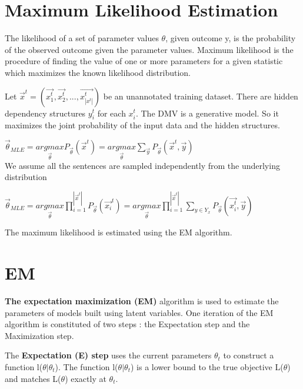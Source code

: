 \documentclass{book}
\begin{document}
\section{Maximum Likelihood Estimation}

The likelihood of a set of parameter values $\theta$, given outcome y, is the probability of the observed outcome given the parameter values. Maximum likelihood is the procedure of finding the value of one or more parameters for a given statistic which maximizes the known likelihood distribution.

Let $\overrightarrow{x}^t = (\overrightarrow{x_1^t}, \overrightarrow{x_2^t}, ..., \overrightarrow{x_{|x^t|}^t})$ be an unannotated training dataset. There are hidden dependency structures $y_i^t$ for each $x_i^t$. The DMV is a generative model. So it maximizes the joint probability of the input data and the hidden structures.


\begin{center}
$\overrightarrow{\theta}_{MLE} = \underset{\overrightarrow{\theta}}{argmax} P_{\overrightarrow{\theta}}(\overrightarrow{x}^t) = \underset{\overrightarrow{\theta}}{argmax} \sum\limits_{\overrightarrow{y}} P_{\overrightarrow{\theta}}(\overrightarrow{x}^t, \overrightarrow{y})$ \\
We assume all the sentences are sampled independently from the underlying distribution

$\overrightarrow{\theta}_{MLE} = \underset{\overrightarrow{\theta}}{argmax} \prod\limits_{i=1}^{|\overrightarrow{x}^t|} P_{\overrightarrow{\theta}}(\overrightarrow{x_{i}}^t) =
 \underset{\overrightarrow{\theta}}{argmax} \prod\limits_{i=1}^{|\overrightarrow{x}^t|} \sum\limits_{y \in Y_{x}} P_{\overrightarrow{\theta}}(\overrightarrow{x_{i}^t}, \overrightarrow{y})$

\end{center}

The maximum likelihood is estimated using the EM algorithm.

\section{EM}

\textbf{The expectation maximization (EM)} algorithm is used to estimate the parameters of models built using latent variables. One iteration of the EM algorithm is constituted of two steps : the Expectation step and the Maximization step. 

The \textbf{Expectation (E) step} uses the current parameters $\theta_t$ to construct a function l($\theta | \theta_t$). The function l($\theta | \theta_t$) is a lower bound to the true objective L($\theta$) and matches L($\theta$) exactly at $\theta_t$.
\end{document}

